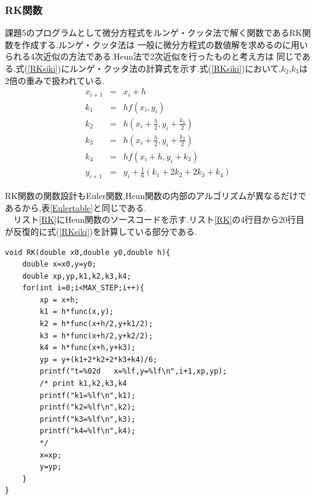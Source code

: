 \documentclass[dvipdfmx]{jarticle}
\begin{document}
      \subsubsection{RK関数}
      課題5のプログラムとして微分方程式をルンゲ・クッタ法で解く関数であるRK関数を作成する.ルンゲ・クッタ法は
      一般に微分方程式の数値解を求めるのに用いられる4次近似の方法である.Heun法で2次近似を行ったものと考え方は
      同じである.式(\ref{RKsiki})にルンゲ・クッタ法の計算式を示す.式(\ref{RKsiki})において,$k_2$,$k_3$は
      2倍の重みで扱われている.
      \begin{eqnarray}
        x_{i+1} &=& x_i+h \label{eulersiki1}\\
        k_1 &=& hf(x_i,y_i)\\
        k_2 &=& h(x_i+\frac{h}{2},y_i+\frac{k_1}{2}) \\
        k_3 &=& h(x_i+\frac{h}{2},y_i+\frac{k_2}{2}) \\
        k_4 &=& hf(x_i+h,y_i+k_3)\\
        y_{i+1} &=& y_i +\frac{1}{6}(k_1+2k_2+2k_3+k_4)
            \label{RKsiki}
      \end{eqnarray}

      RK関数の関数設計もEuler関数,Heun関数の内部のアルゴリズムが異なるだけであるから,表\ref{Eulertable}と同じである.\\
      　リスト\ref{RK}にHeun関数のソースコードを示す.リスト\ref{RK}の4行目から20行目が反復的に式(\ref{RKsiki})を計算している部分である.
    \begin{lstlisting}[basicstyle=\ttfamily\footnotesize, frame=single,label=RK,caption=RK関数]
void RK(double x0,double y0,double h){
    double x=x0,y=y0;
    double xp,yp,k1,k2,k3,k4;
    for(int i=0;i<MAX_STEP;i++){
        xp = x+h;
        k1 = h*func(x,y);
        k2 = h*func(x+h/2,y+k1/2);
        k3 = h*func(x+h/2,y+k2/2);
        k4 = h*func(x+h,y+k3);
        yp = y+(k1+2*k2+2*k3+k4)/6;
        printf("t=%02d   x=%lf,y=%lf\n",i+1,xp,yp);
        /* print k1,k2,k3,k4
        printf("k1=%lf\n",k1);
        printf("k2=%lf\n",k2);
        printf("k3=%lf\n",k3);
        printf("k4=%lf\n",k4);
        */
        x=xp;
        y=yp;
    }
}

    \end{lstlisting}   
\end{document}
